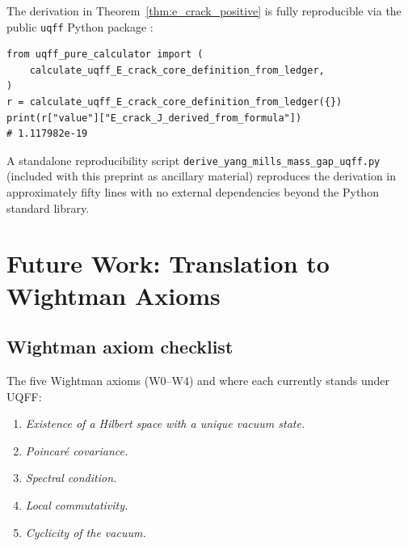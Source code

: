 \documentclass[11pt,a4paper,onecolumn]{article}
\theoremstyle{plain}
\theoremstyle{definition}
\theoremstyle{remark}
\begin{document}
The derivation in Theorem~\ref{thm:e_crack_positive} is fully
reproducible via the public \texttt{uqff} Python package
\cite{murphy2026uqff}:

\begin{lstlisting}
from uqff_pure_calculator import (
    calculate_uqff_E_crack_core_definition_from_ledger,
)
r = calculate_uqff_E_crack_core_definition_from_ledger({})
print(r["value"]["E_crack_J_derived_from_formula"])
# 1.117982e-19
\end{lstlisting}

\noindent
A standalone reproducibility script
\texttt{derive\_yang\_mills\_mass\_gap\_uqff.py} (included with this
preprint as ancillary material) reproduces the derivation in
approximately fifty lines with no external dependencies beyond the
Python standard library.

\section{Future Work: Translation to Wightman Axioms}\label{sec:future}


\subsection{Wightman axiom checklist}
The five Wightman axioms (W0--W4) and where each currently stands
under UQFF:
\begin{enumerate}
\item[W0] \textit{Existence of a Hilbert space with a unique vacuum
  state.}
\item[W1] \textit{Poincar\'e covariance.}
\item[W2] \textit{Spectral condition.}
\item[W3] \textit{Local commutativity.}
\item[W4] \textit{Cyclicity of the vacuum.}
\end{enumerate}
\end{document}
